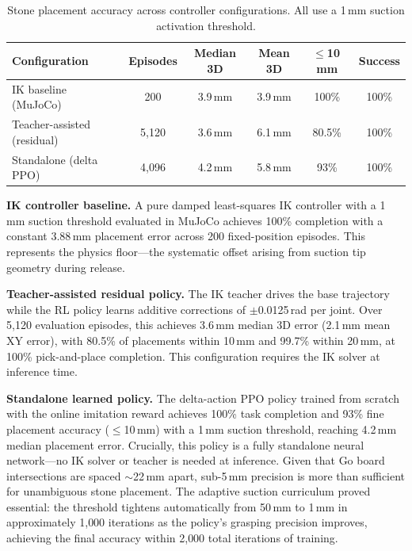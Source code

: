 \documentclass{article}
\begin{document}
\begin{table}[t]
\centering
\caption{Stone placement accuracy across controller configurations. All use a 1\,mm suction activation threshold.}
\label{tab:placement_results}
\small
\begin{tabular}{@{}lccccc@{}}
\toprule
\textbf{Configuration} & \textbf{Episodes} & \textbf{Median 3D} & \textbf{Mean 3D} & \textbf{$\leq$10\,mm} & \textbf{Success} \\
\midrule
IK baseline (MuJoCo)        & 200     & 3.9\,mm & 3.9\,mm & 100\%  & 100\% \\
Teacher-assisted (residual)  & 5{,}120 & 3.6\,mm & 6.1\,mm & 80.5\% & 100\% \\
Standalone (delta PPO)       & 4{,}096 & 4.2\,mm & 5.8\,mm & 93\%   & 100\% \\
\bottomrule
\end{tabular}
\end{table}

\textbf{IK controller baseline.} A pure damped least-squares IK controller with a 1\,mm suction threshold evaluated in MuJoCo achieves 100\% completion with a constant 3.88\,mm placement error across 200 fixed-position episodes. This represents the physics floor---the systematic offset arising from suction tip geometry during release.

\textbf{Teacher-assisted residual policy.} The IK teacher drives the base trajectory while the RL policy learns additive corrections of $\pm$0.0125\,rad per joint. Over 5,120 evaluation episodes, this achieves 3.6\,mm median 3D error (2.1\,mm mean XY error), with 80.5\% of placements within 10\,mm and 99.7\% within 20\,mm, at 100\% pick-and-place completion. This configuration requires the IK solver at inference time.

\textbf{Standalone learned policy.} The delta-action PPO policy trained from scratch with the online imitation reward achieves 100\% task completion and 93\% fine placement accuracy ($\leq$10\,mm) with a 1\,mm suction threshold, reaching 4.2\,mm median placement error. Crucially, this policy is a fully standalone neural network---no IK solver or teacher is needed at inference. Given that Go board intersections are spaced ${\sim}$22\,mm apart, sub-5\,mm precision is more than sufficient for unambiguous stone placement. The adaptive suction curriculum proved essential: the threshold tightens automatically from 50\,mm to 1\,mm in approximately 1{,}000 iterations as the policy's grasping precision improves, achieving the final accuracy within 2{,}000 total iterations of training.
\end{document}
